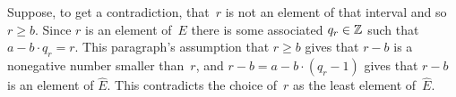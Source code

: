 \documentclass{test}  %
\begin{document}
\begin{problem}
\begin{exes}
\begin{answer}
  Suppose, to get a contradiction, that~$r$ is not 
  an element of that interval and so $r\geq b$.
  Since $r$ is an element of~$E$ there is some associated
  $q_r\in\mathbb{Z}$ such that $a-b\cdot q_r=r$.
  This paragraph's assumption that $r\geq b$
  gives that $r-b$ is a nonegative number smaller than~$r$, and
  $r-b=a-b\cdot (q_r-1)$ gives that $r-b$ is an element of $\hat{E}$.
  This contradicts the choice of~$r$ as the least element of~$\hat{E}$.
\end{answer}
\end{exes}



\end{problem}
\end{document}
